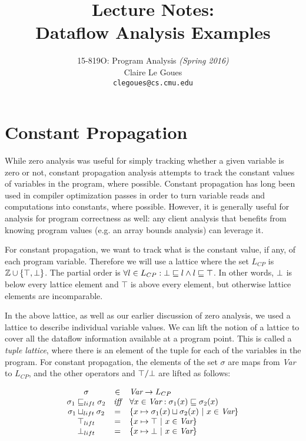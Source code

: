 \documentclass[11pt]{article}
\title{Lecture Notes:\\
Dataflow Analysis Examples}
\author{15-819O: Program Analysis  \emph{(Spring 2016)} \\
        Claire Le Goues  \\
		{\tt clegoues@cs.cmu.edu}}
\date{}
\def\Integer{\mathbb{Z}}
\newcommand{\join}{\sqcup}
\newcommand{\alap}{\sqsubseteq}
\begin{document}
\newtheorem{theorem}{Theorem}
\newtheorem{lemma}[theorem]{Lemma}

\maketitle

\section{Constant Propagation}

While zero analysis was useful for simply tracking whether a given variable is zero or not, constant propagation analysis attempts to track the constant values of variables in the program, where possible.  Constant propagation has long been used in compiler optimization passes in order to turn variable reads and computations into constants, where possible.  However, it is generally useful for analysis for program correctness as well: any client analysis that benefits from knowing program values (e.g. an array bounds analysis) can leverage it.

For constant propagation, we want to track what is the constant value, if any, of each program variable.  Therefore we will use a lattice where the set $L_{CP}$ is $\Integer \union \{ \top, \bottom \}$.  The partial order is $\forall l \in L_{CP}: \bottom \alap l \land l \alap \top$.  In other words, $\bot$ is below every lattice element and $\top$ is above every element, but otherwise lattice elements are incomparable.

In the above lattice, as well as our earlier discussion of zero analysis, we used a lattice to describe individual variable values.  We can lift the notion of a lattice to cover all the dataflow information available at a program point.  This is called a \textit{tuple lattice}, where there is an element of the tuple for each of the variables in the program.  For constant propagation, the elements of the set $\sigma$ are maps from \textit{Var} to $L_{CP}$, and the other operators and $\top/\bot$ are lifted as follows:

\[
\begin{array}{ccl}

\sigma & \in & \textit{Var} \rightarrow L_{CP}\\
\sigma_1 \alap_{lift} \sigma_2 & \textit{iff} & \forall x \in \textit{Var} : \sigma_1(x) \alap \sigma_2(x)\\
\sigma_1 \join_{lift} \sigma_2 & = & \{ x \mapsto \sigma_1(x) \join \sigma_2(x) ~|~ x \in \textit{Var} \}\\
\top_{lift} & = & \{ x \mapsto \top ~|~ x \in \textit{Var} \}\\
\bottom_{lift} & = & \{ x \mapsto \bottom ~|~ x \in \textit{Var} \}\\

\end{array}
\]
\end{document}
